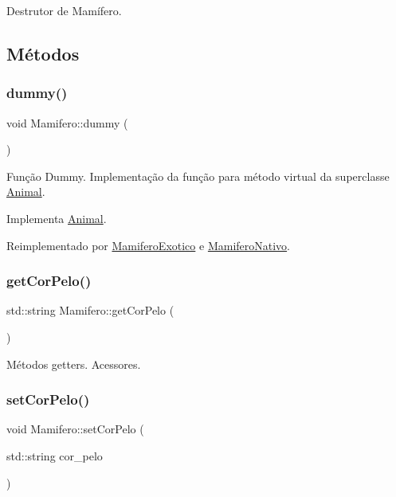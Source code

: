 Destrutor de Mamífero. 

\subsection{Métodos}
\mbox{\label{classMamifero_a8f2a488b1796d3ccf0ff9e1c5a82af05}} 
\subsubsection{\texorpdfstring{dummy()}{dummy()}}
{\footnotesize\ttfamily void Mamifero\+::dummy (\begin{DoxyParamCaption}{ }\end{DoxyParamCaption})\hspace{0.3cm}{\ttfamily [virtual]}}

Função Dummy. Implementação da função para método virtual da superclasse \hyperlink{classAnimal}{Animal}. 

Implementa \hyperlink{classAnimal_a88fa81bb01530eaa71656b678bf05b5b}{Animal}.



Reimplementado por \hyperlink{classMamiferoExotico_a0198a13cb62c2400c3a1e9e8a3ddc792}{Mamifero\+Exotico} e \hyperlink{classMamiferoNativo_a79092135d515ffb00c24dcc8bc073acc}{Mamifero\+Nativo}.

\mbox{\label{classMamifero_ab164b4053fcb1912af011c1204b19fc1}} 
\subsubsection{\texorpdfstring{get\+Cor\+Pelo()}{getCorPelo()}}
{\footnotesize\ttfamily std\+::string Mamifero\+::get\+Cor\+Pelo (\begin{DoxyParamCaption}{ }\end{DoxyParamCaption})}

Métodos getters. Acessores. \mbox{\label{classMamifero_aae48d8a2c42c954cabebaeeb47a65b77}} 
\subsubsection{\texorpdfstring{set\+Cor\+Pelo()}{setCorPelo()}}
{\footnotesize\ttfamily void Mamifero\+::set\+Cor\+Pelo (\begin{DoxyParamCaption}\item[{std\+::string}]{cor\+\_\+pelo }\end{DoxyParamCaption})}

